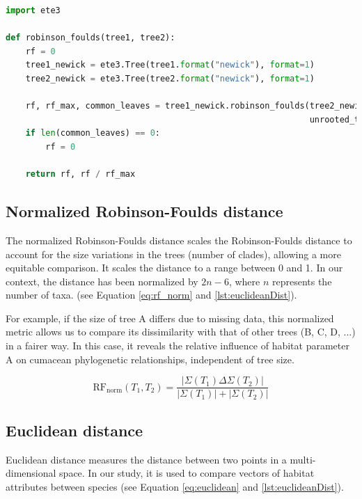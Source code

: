 \begin{lstlisting}[label=lst:robinsonFoulds,language=Python,caption=Python script for calculating the Robinson-Foulds distance using the ete3 package in the aPhyloGeo package.]
import ete3

def robinson_foulds(tree1, tree2):
    rf = 0
    tree1_newick = ete3.Tree(tree1.format("newick"), format=1)
    tree2_newick = ete3.Tree(tree2.format("newick"), format=1)

    rf, rf_max, common_leaves = tree1_newick.robinson_foulds(tree2_newick, 
                                                             unrooted_trees=True)
    if len(common_leaves) == 0:
        rf = 0

    return rf, rf / rf_max
\end{lstlisting}

\subsection{Normalized Robinson-Foulds distance}\label{RFnorm}

The normalized Robinson-Foulds distance scales the Robinson-Foulds distance to account for the size variations in the trees (number of clades), allowing a more equitable comparison. It scales the distance to a range between 0 and 1. In our context, the distance has been normalized by $2n-6$, where $n$ represents the number of taxa. (see Equation \eqref{eq:rf_norm} and \autoref{lst:euclideanDist}).

For example, if the size of tree A differs due to missing data, this normalized metric allows us to compare its dissimilarity with that of other trees (B, C, D, ...) in a fairer way. In this case, it reveals the relative influence of habitat parameter A on cumacean phylogenetic relationships, independent of tree size.

\begin{equation}\label{eq:rf_norm}
    \text{RF}_{\text{norm}}(T_1, T_2) = \frac{| \Sigma(T_1) \Delta \Sigma(T_2) |}{| \Sigma(T_1) | + | \Sigma(T_2) |}
\end{equation}

\subsection{Euclidean distance}\label{euclidean}

Euclidean distance measures the distance between two points in a multi-dimensional space. In our study, it is used to compare vectors of habitat attributes between species (see Equation \eqref{eq:euclidean} and \autoref{lst:euclideanDist}).

